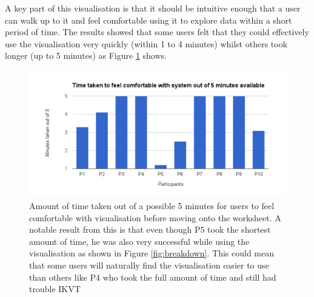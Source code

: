 A key part of this visualisation is that it should be intuitive enough that a
user can walk up to it and feel comfortable using it to explore data within a
short period of time. The results showed that some users felt that they could
effectively use the visualisation very quickly (within 1 to 4 minutes) whilst
others took longer (up to 5 minutes) as Figure \ref{fig:comfort} shows. 
\begin{figure}[H]
  \centering
      \includegraphics[width=1\textwidth]{images/comfort.pdf}
  \caption[Time taken to feel familiar with IKVT]{Amount of time taken out of a
possible 5 minutes for users to feel
comfortable with
visualisation before moving onto the worksheet. A notable result from this is
that even though P5 took the shortest amount of time, he was also very
successful while using the visualisation as shown in Figure
\ref{fig:breakdown}. This could mean that some users will naturally find the
visualisation easier to use than others like P4 who took the full amount of time
and still had trouble IKVT}  
\label{fig:comfort}
\end{figure}

